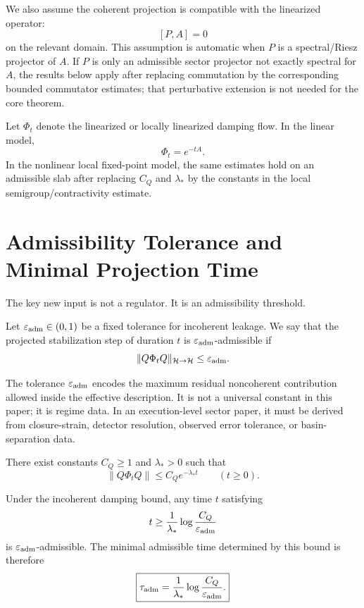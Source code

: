\documentclass[11pt]{article}
\begin{document}
We also assume the coherent projection is compatible with the linearized operator:
\[
[P,A]=0
\]
on the relevant domain. This assumption is automatic when \(P\) is a spectral/Riesz projector of \(A\). If \(P\) is only an admissible sector projector not exactly spectral for \(A\), the results below apply after replacing commutation by the corresponding bounded commutator estimates; that perturbative extension is not needed for the core theorem.

Let \(\Phi_t\) denote the linearized or locally linearized damping flow. In the linear model,
\[
\Phi_t=e^{-tA}.
\]
In the nonlinear local fixed-point model, the same estimates hold on an admissible slab after replacing \(C_Q\) and \(\lambda_\ast\) by the constants in the local semigroup/contractivity estimate.

\section{Admissibility Tolerance and Minimal Projection Time}

The key new input is not a regulator. It is an admissibility threshold.

\begin{definition}
Let \(\varepsilon_{\rm adm}\in(0,1)\) be a fixed tolerance for incoherent leakage. We say that the projected stabilization step of duration \(t\) is \(\varepsilon_{\rm adm}\)-admissible if
\[
\|Q\Phi_t Q\|_{\mathcal H\to\mathcal H}
\le \varepsilon_{\rm adm}.
\]
\end{definition}

The tolerance \(\varepsilon_{\rm adm}\) encodes the maximum residual noncoherent contribution allowed inside the effective description. It is not a universal constant in this paper; it is regime data. In an execution-level sector paper, it must be derived from closure-strain, detector resolution, observed error tolerance, or basin-separation data.

\begin{assumption}
There exist constants \(C_Q\ge1\) and \(\lambda_\ast>0\) such that
\[
\|Q\Phi_tQ\|\le C_Qe^{-\lambda_\ast t}
\qquad (t\ge0).
\]
\end{assumption}

\begin{theorem}
Under the incoherent damping bound, any time \(t\) satisfying
\[
t\ge \frac{1}{\lambda_\ast}\log\frac{C_Q}{\varepsilon_{\rm adm}}
\]
is \(\varepsilon_{\rm adm}\)-admissible. The minimal admissible time determined by this bound is therefore
\[
\boxed{
\tau_{\rm adm}
=
\frac{1}{\lambda_\ast}\log\frac{C_Q}{\varepsilon_{\rm adm}} .
}
\]
\end{theorem}
\end{document}
